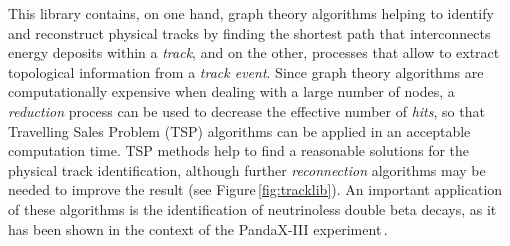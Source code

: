 This library contains, on one hand, graph theory algorithms helping to identify and reconstruct physical tracks by finding the shortest path that interconnects energy deposits within a \emph{track}, and on the other, processes that allow to extract topological information from a \emph{track event}. Since graph theory algorithms are computationally expensive when dealing with a large number of nodes, a \emph{reduction} process can be used to decrease the effective number of \emph{hits}, so that Travelling Sales Problem (TSP) algorithms can be applied in an acceptable computation time. TSP methods help to find a reasonable solutions for the physical track identification, although further \emph{reconnection} algorithms may be needed to improve the result (see Figure\,\ref{fig:tracklib}). An important application of these algorithms is the identification of neutrinoless double beta decays, as it has been shown in the context of the PandaX-III experiment\,\cite{Galan:2019ake}.

